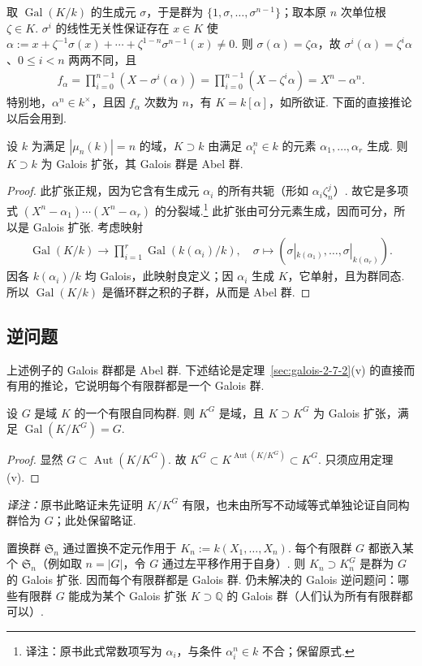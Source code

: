 取 $\operatorname{Gal}(K/k)$ 的生成元 $\sigma$，于是群为 $\{1,\sigma,\ldots,\sigma^{n-1}\}$；取本原 $n$ 次单位根 $\zeta\in K$. $\sigma^i$ 的线性无关性保证存在 $x\in K$ 使 $\alpha:=x+\zeta^{-1}\sigma(x)+\cdots+\zeta^{1-n}\sigma^{n-1}(x)\ne0$. 则 $\sigma(\alpha)=\zeta\alpha$，故 $\sigma^i(\alpha)=\zeta^i\alpha$、$0\leq i<n$ 两两不同，且
\begin{align*}f_\alpha=\prod_{i=0}^{n-1}(X-\sigma^i(\alpha))=\prod_{i=0}^{n-1}(X-\zeta^i\alpha)=X^n-\alpha^n.\end{align*}
特别地，$\alpha^n\in k^\times$，且因 $f_\alpha$ 次数为 $n$，有 $K=k[\alpha]$，如所欲证.
下面的直接推论以后会用到.
\begin{corollary*}设 $k$ 为满足 $|\mu_n(k)|=n$ 的域，$K\supset k$ 由满足 $\alpha_i^n\in k$ 的元素 $\alpha_1,\ldots,\alpha_r$ 生成. 则 $K\supset k$ 为 Galois 扩张，其 Galois 群是 Abel 群.\end{corollary*}
\begin{proof}此扩张正规，因为它含有生成元 $\alpha_i$ 的所有共轭（形如 $\alpha_i\zeta_n^j$）. 故它是多项式 $(X^n-\alpha_1)\cdots(X^n-\alpha_r)$ 的分裂域.\footnote{译注：原书此式常数项写为 $\alpha_i$，与条件 $\alpha_i^n\in k$ 不合；保留原式.} 此扩张由可分元素生成，因而可分，所以是 Galois 扩张. 考虑映射
\begin{align*}\operatorname{Gal}(K/k)\to\prod_{i=1}^r\operatorname{Gal}(k(\alpha_i)/k),\quad\sigma\mapsto(\sigma|_{k(\alpha_1)},\ldots,\sigma|_{k(\alpha_r)}).\end{align*}
因各 $k(\alpha_i)/k$ 均 Galois，此映射良定义；因 $\alpha_i$ 生成 $K$，它单射，且为群同态. 所以 $\operatorname{Gal}(K/k)$ 是循环群之积的子群，从而是 Abel 群.\end{proof}
\subsection{逆问题}\label{sec:galois-2-7-6}
上述例子的 Galois 群都是 Abel 群. 下述结论是定理~\ref{sec:galois-2-7-2}(v) 的直接而有用的推论，它说明每个有限群都是一个 Galois 群.
\begin{corollary*}设 $G$ 是域 $K$ 的一个有限自同构群. 则 $K^G$ 是域，且 $K\supset K^G$ 为 Galois 扩张，满足 $\operatorname{Gal}(K/K^G)=G$.\end{corollary*}
\begin{proof}显然 $G\subset\operatorname{Aut}(K/K^G)$. 故 $K^G\subset K^{\operatorname{Aut}(K/K^G)}\subset K^G$. 只须应用定理(v).\end{proof}
\noindent\emph{译注：}原书此略证未先证明 $K/K^G$ 有限，也未由所写不动域等式单独论证自同构群恰为 $G$；此处保留略证.
\begin{example*}置换群 $\mathfrak S_n$ 通过置换不定元作用于 $K_n:=k(X_1,\ldots,X_n)$. 每个有限群 $G$ 都嵌入某个 $\mathfrak S_n$（例如取 $n=|G|$，令 $G$ 通过左平移作用于自身）. 则 $K_n\supset K_n^G$ 是群为 $G$ 的 Galois 扩张. 因而每个有限群都是 Galois 群. 仍未解决的 Galois 逆问题问：哪些有限群 $G$ 能成为某个 Galois 扩张 $K\supset\mathbb Q$ 的 Galois 群（人们认为所有有限群都可以）.\end{example*}

